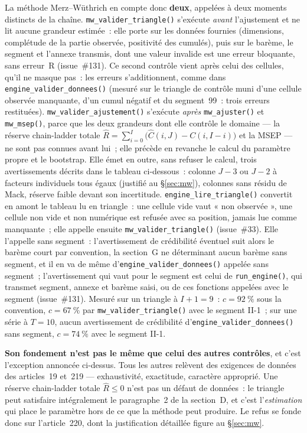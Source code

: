 \documentclass[a4paper,11pt]{article}
\newcommand{\code}[1]{\texttt{\small #1}}
\begin{document}
La méthode Merz--Wüthrich en compte donc \textbf{deux}, appelées à deux moments
distincts de la chaîne. \code{mw\_valider\_triangle()} s'exécute \emph{avant}
l'ajustement et ne lit aucune grandeur estimée~: elle porte sur les données fournies
(dimensions, complétude de la partie observée, positivité des cumulés), puis sur le barème, le
segment et l'annexe transmis, dont une valeur invalide est une erreur bloquante, sans erreur~R
(issue~\#131). Ce second contrôle vient après celui des cellules, qu'il ne masque pas~: les
erreurs s'additionnent, comme dans \code{engine\_valider\_donnees()} (mesuré sur le triangle de
contrôle muni d'une cellule observée manquante, d'un cumul négatif et du segment~99~: trois erreurs
restituées). \code{mw\_valider\_ajustement()}
s'exécute \emph{après} \code{mw\_ajuster()} et \code{mw\_msep()}, parce que les
deux grandeurs dont elle contrôle le domaine --- la réserve chain-ladder totale
$\hat R = \sum_{i=0}^{I}\big(\hat C(i,J) - C(i,I-i)\big)$ et la MSEP --- ne sont
pas connues avant lui~; elle précède en revanche le calcul du paramètre propre et
le bootstrap. Elle émet en outre, sans refuser le calcul, trois avertissements décrits dans
le tableau ci-dessous~: colonne $J-3$ ou $J-2$ à facteurs individuels tous égaux (justifié au
§\ref{sec:mw}), colonnes sans résidu de Mack, réserve faible devant son incertitude.
\code{engine\_lire\_triangle()} convertit en amont le tableau lu en triangle~: une cellule vide
vaut « non observée », une cellule non vide et non numérique est refusée avec sa position,
jamais lue comme manquante~; elle appelle ensuite \code{mw\_valider\_triangle()} (issue~\#33).
Elle l'appelle sans segment~: l'avertissement de crédibilité éventuel suit alors le barème court
par convention, la section~G ne déterminant aucun barème sans segment, et il en va de même
d'\code{engine\_valider\_donnees()} appelée sans segment~; l'avertissement qui vaut pour le
segment est celui de \code{run\_engine()}, qui transmet segment, annexe et barème saisi, ou de
ces fonctions appelées avec le segment (issue~\#131). Mesuré sur un triangle à $I + 1 = 9$~:
$c = 92~\%$ sous la convention, $c = 67~\%$ par \code{mw\_valider\_triangle()} avec le
segment II-1~; sur une série à $T = 10$, aucun avertissement de crédibilité
d'\code{engine\_valider\_donnees()} sans segment, $c = 74~\%$ avec le segment II-1.

\textbf{Son fondement n'est pas le même que celui des autres contrôles}, et c'est
l'exception annoncée ci-dessus. Tous les autres relèvent des exigences de données
des articles~19 et~219 --- exhaustivité, exactitude, caractère approprié. Une
réserve chain-ladder totale $\hat R \le 0$ n'est pas un défaut de données~: le
triangle peut satisfaire intégralement le paragraphe~2 de la section~D, et c'est
l'\emph{estimation} qui place le paramètre hors de ce que la méthode peut
produire. Le refus se fonde donc sur l'article~220, dont la justification
détaillée figure au §\ref{sec:mw}.
\end{document}
